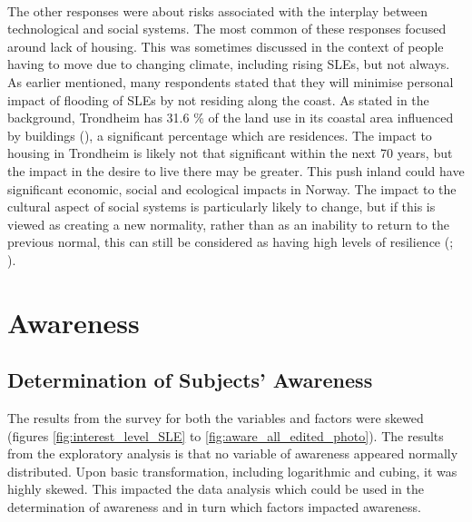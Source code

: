 \paragraph{}
The other responses were about risks associated with the interplay between technological and social systems. The most common of these responses focused around lack of housing. This was sometimes discussed in the context of people having to move due to changing climate, including rising SLEs, but not always.  As earlier mentioned, many respondents stated that they will minimise personal impact of flooding of SLEs by not residing along the coast.  As stated in the background, Trondheim has 31.6 \% of the land use in its coastal area influenced by buildings (\cite{engebakken_construction_2022}), a significant percentage which are residences. The impact to housing in Trondheim is likely not that significant within the next 70 years, but the impact in the desire to live there may be greater. This push inland could have significant economic, social and ecological impacts in Norway. The impact to the cultural aspect of social systems is particularly likely to change, but if this is viewed as creating a new normality, rather than as an inability to return to the previous normal, this can still be considered as having high levels of resilience (\cite{cutter_place-based_2008}; \cite{cutter_community_2020}).
\paragraph{}




\section{Awareness} \label{discuss-aware}

\subsection{Determination of Subjects' Awareness}
The results from the survey for both the variables and factors were skewed (figures \ref{fig:interest_level_SLE} to \ref{fig:aware_all_edited_photo}). The results from the exploratory analysis is that no variable of awareness appeared normally distributed. Upon basic transformation, including logarithmic and cubing, it was highly skewed. This impacted the data analysis which could be used in the determination of awareness and in turn which factors impacted awareness. 

